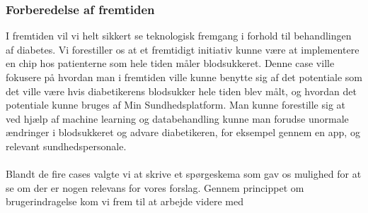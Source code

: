 \subsubsection{Forberedelse af fremtiden}
I fremtiden vil vi helt sikkert se teknologisk fremgang i forhold til behandlingen af diabetes. Vi forestiller os at et fremtidigt initiativ kunne være at implementere en chip hos patienterne som hele tiden måler blodsukkeret. Denne case ville fokusere på hvordan man i fremtiden ville kunne benytte sig af det potentiale som det ville være hvis diabetikerens blodsukker hele tiden blev målt, og hvordan det potentiale kunne bruges af Min Sundhedsplatform. Man kunne forestille sig at ved hjælp af machine learning og databehandling kunne man forudse unormale ændringer i blodsukkeret og advare diabetikeren, for eksempel gennem en app, og relevant sundhedspersonale.\\\\
Blandt de fire cases valgte vi at skrive et spørgeskema som gav os mulighed for at se om der er nogen relevans for vores forslag. Gennem princippet om brugerindragelse kom vi frem til at arbejde videre med  